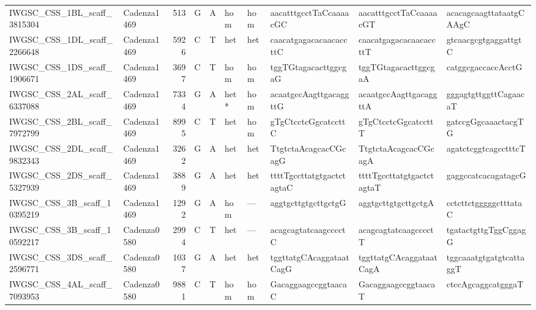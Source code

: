 \begin{tabular}{llrlllllll}
 IWGSC\_CSS\_1BL\_scaff\_3815304  & Cadenza1469 &        513 & G         & A        & hom            & hom         & aacatttgcctTaCcaaaacGC    & aacatttgcctTaCcaaaacGT    & acacagcaagttataatgCAAgC   \\
 IWGSC\_CSS\_1DL\_scaff\_2266648  & Cadenza1469 &       5926 & C         & T        & het            & het         & caacatgagacacaacaccttC    & caacatgagacacaacaccttT    & gtcaacgcgtgaggattgtC      \\
 IWGSC\_CSS\_1DS\_scaff\_1906671  & Cadenza1469 &       3697 & C         & T        & hom            & hom         & tggTGtagacacttggcgaG      & tggTGtagacacttggcgaA      & catggcgaccaccAcctG        \\
 IWGSC\_CSS\_2AL\_scaff\_6337088  & Cadenza1469 &       7334 & G         & A        & het*           & hom         & acaatgccAagttgacaggttG    & acaatgccAagttgacaggttA    & gggagtgttggttCagaacaT     \\
 IWGSC\_CSS\_2BL\_scaff\_7972799  & Cadenza1469 &       8995 & C         & T        & het            & hom         & gTgCtcctcGgcatccttC       & gTgCtcctcGgcatccttT       & gatccgGgcaaactacgTG       \\
 IWGSC\_CSS\_2DL\_scaff\_9832343  & Cadenza1469 &       3262 & G         & A        & het            & het         & TtgtctaAcagcacCGcagG      & TtgtctaAcagcacCGcagA      & agatctcggtcagcctttcT      \\
 IWGSC\_CSS\_2DS\_scaff\_5327939  & Cadenza1469 &       3889 & G         & A        & het            & het         & ttttTgccttatgtgactctagtaC & ttttTgccttatgtgactctagtaT & gaggccatcacagatagcG       \\
 IWGSC\_CSS\_3B\_scaff\_10395219  & Cadenza1469 &       1292 & G         & A        & hom            & ---         & aggtgcttgtgcttgctgG       & aggtgcttgtgcttgctgA       & cctcttctgggggctttataC     \\
 IWGSC\_CSS\_3B\_scaff\_10592217  & Cadenza0580 &       2994 & C         & T        & het            & ---         & acagcagtatcaagcccctC      & acagcagtatcaagcccctT      & tgatactgttgTggCggagG      \\
 IWGSC\_CSS\_3DS\_scaff\_2596771  & Cadenza0580 &       1037 & G         & A        & het            & het         & tggttatgCAcaggataatCagG   & tggttatgCAcaggataatCagA   & tggcaaatgtgatgtcattaggT   \\
 IWGSC\_CSS\_4AL\_scaff\_7093953  & Cadenza0580 &       9881 & C         & T        & hom            & hom         & GacaggaagccggtaacaC       & GacaggaagccggtaacaT       & ctccAgcaggcatgggaT        \\

\end{tabular}
